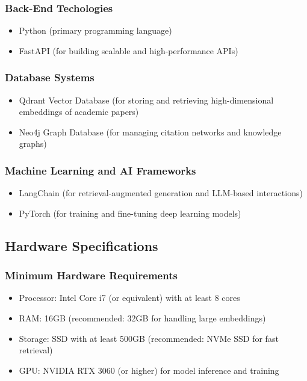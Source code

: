\documentclass[a4paper,12pt]{article}
\begin{document}
\subsubsection{Back-End Techologies}
\begin{itemize}
    \item Python (primary programming language)
    \vspace{-10pt}
    \item FastAPI (for building scalable and high-performance APIs)
\end{itemize}

\subsubsection{Database Systems}
\begin{itemize}
    \item Qdrant Vector Database (for storing and retrieving high-dimensional embeddings of academic papers)
    \vspace{-10pt}
    \item Neo4j Graph Database (for managing citation networks and knowledge graphs)
\end{itemize}

\subsubsection{Machine Learning and AI Frameworks}
\begin{itemize}
    \item LangChain (for retrieval-augmented generation and LLM-based interactions)
    \vspace{-10pt}
    \item PyTorch (for training and fine-tuning deep learning models)
\end{itemize}

\subsection{Hardware Specifications}
\subsubsection{Minimum Hardware Requirements}
\begin{itemize}
    \item Processor: Intel Core i7 (or equivalent) with at least 8 cores
    \vspace{-10pt}
    \item RAM: 16GB (recommended: 32GB for handling large embeddings)
    \vspace{-10pt}
    \item Storage: SSD with at least 500GB (recommended: NVMe SSD for fast retrieval)
    \vspace{-10pt}
    \item GPU: NVIDIA RTX 3060 (or higher) for model inference and training
\end{itemize}
\end{document}
